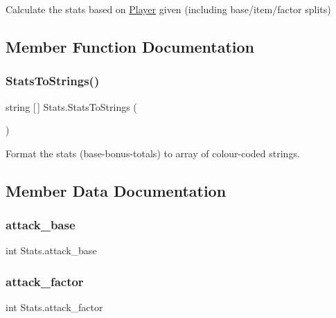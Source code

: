 Calculate the stats based on \mbox{\hyperlink{class_player}{Player}} given (including base/item/factor splits) 



\subsection{Member Function Documentation}
\mbox{\label{class_stats_acae5dda69cd0f8843eed4d72e16284e6}} 
\subsubsection{\texorpdfstring{StatsToStrings()}{StatsToStrings()}}
{\footnotesize\ttfamily string \mbox{[}$\,$\mbox{]} Stats.\+Stats\+To\+Strings (\begin{DoxyParamCaption}{ }\end{DoxyParamCaption})\hspace{0.3cm}{\ttfamily [inline]}}



Format the stats (base-\/bonus-\/totals) to array of colour-\/coded strings. 



\subsection{Member Data Documentation}
\mbox{\label{class_stats_ad9eb2f88006a8a248d90ca9fe68bd492}} 
\subsubsection{\texorpdfstring{attack\_base}{attack\_base}}
{\footnotesize\ttfamily int Stats.\+attack\+\_\+base\hspace{0.3cm}{\ttfamily [private]}}

\mbox{\label{class_stats_ae650131fb2e278f48782e23b0a60038d}} 
\subsubsection{\texorpdfstring{attack\_factor}{attack\_factor}}
{\footnotesize\ttfamily int Stats.\+attack\+\_\+factor\hspace{0.3cm}{\ttfamily [private]}}

